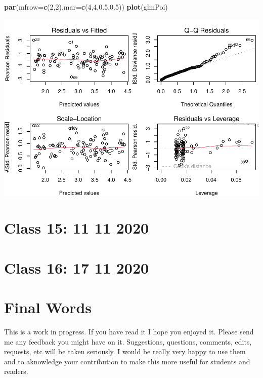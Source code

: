 \documentclass[
]{book}
\newenvironment{Shaded}{\begin{snugshade}}{\end{snugshade}}
\newcommand{\DataTypeTok}[1]{\textcolor[rgb]{0.13,0.29,0.53}{#1}}
\newcommand{\DecValTok}[1]{\textcolor[rgb]{0.00,0.00,0.81}{#1}}
\newcommand{\FloatTok}[1]{\textcolor[rgb]{0.00,0.00,0.81}{#1}}
\newcommand{\KeywordTok}[1]{\textcolor[rgb]{0.13,0.29,0.53}{\textbf{#1}}}
\newcommand{\NormalTok}[1]{#1}
\begin{document}
\begin{Shaded}
\begin{Highlighting}[]
\KeywordTok{par}\NormalTok{(}\DataTypeTok{mfrow=}\KeywordTok{c}\NormalTok{(}\DecValTok{2}\NormalTok{,}\DecValTok{2}\NormalTok{),}\DataTypeTok{mar=}\KeywordTok{c}\NormalTok{(}\DecValTok{4}\NormalTok{,}\DecValTok{4}\NormalTok{,}\FloatTok{0.5}\NormalTok{,}\FloatTok{0.5}\NormalTok{))}
\KeywordTok{plot}\NormalTok{(glmPoi)}
\end{Highlighting}
\end{Shaded}

\includegraphics{ECOMODbook_files/figure-latex/glm7-1.pdf}

\hypertarget{aula15}{%
\chapter{Class 15: 11 11 2020}\label{aula15}}

\hypertarget{aula16}{%
\chapter{Class 16: 17 11 2020}\label{aula16}}

\hypertarget{final-words}{%
\chapter{Final Words}\label{final-words}}

This is a work in progress. If you have read it I hope you enjoyed it. Please send me any feedback you might have on it. Suggestions, questions, comments, edits, requests, etc will be taken seriously. I would be really very happy to use them and to aknowledge your contribution to make this more useful for students and readers.

  
\end{document}
